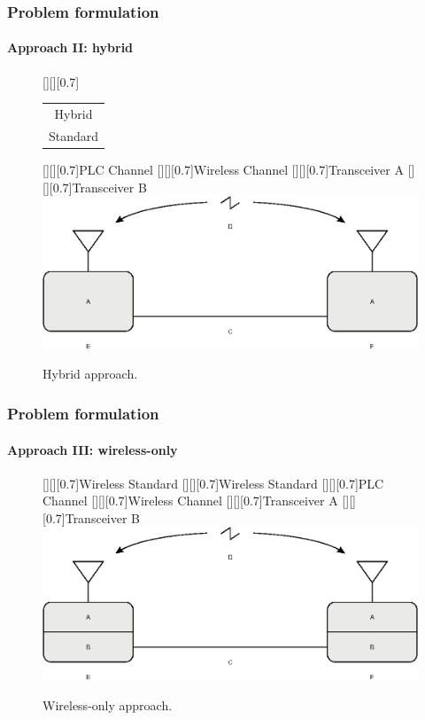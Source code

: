 \documentclass[mathserif]{beamer}
\begin{document}
\begin{frame}
	\frametitle{Problem formulation}
	\framesubtitle{Approach II: hybrid}
	\renewcommand{\sizeLetter}{0.7}
	\begin{figure}[ht]
		\centering
		[][][\sizeLetter]{\begin{tabular}{@{}c@{}}
				Hybrid\\ 
				Standard\\ 
		\end{tabular} }
		[][][\sizeLetter]{PLC Channel}
		[][][\sizeLetter]{Wireless Channel}
		[][][\sizeLetter]{Transceiver A}
		[][][\sizeLetter]{Transceiver B}
		\includegraphics[width=\linewidth]{figuras/plc_wl_scheme2}
		\caption{Hybrid approach.}
		\label{fig:plcwlscheme2}
	\end{figure}
\end{frame}

\begin{frame}
	\frametitle{Problem formulation}
	\framesubtitle{Approach III: wireless-only}
	\renewcommand{\sizeLetter}{0.7}
	\begin{figure}[ht]
		\centering
		[][][\sizeLetter]{Wireless Standard}
		[][][\sizeLetter]{Wireless Standard}
		[][][\sizeLetter]{PLC Channel}
		[][][\sizeLetter]{Wireless Channel}
		[][][\sizeLetter]{Transceiver A}
		[][][\sizeLetter]{Transceiver B}
		\includegraphics[width=\linewidth]{figuras/plc_wl_scheme}
		\caption{Wireless-only approach.}
		\label{fig:plcwlscheme3}
	\end{figure}
\end{frame}
\end{document}
